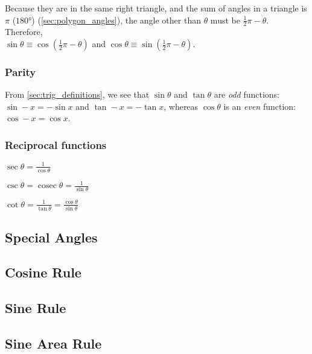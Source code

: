 \documentclass[a4paper,11pt]{article}
\begin{document}
    Because they are in the same right triangle, and the sum of angles in a
    triangle is $\pi$ ($\ang{180}$) (\ref{sec:polygon_angles}), the angle other
    than $\theta$ must be $\frac 12 \pi - \theta$. Therefore,
    \\$\sin \theta \equiv \cos(\frac 12 \pi - \theta)$ and
    $\cos \theta \equiv \sin(\frac 12 \pi - \theta)$.

    \subsubsection{Parity} \label{sec:trig_parity}

    From \ref{sec:trig_definitions}, we see that $\sin \theta$ and $\tan \theta$
    are \textit{odd} functions: $\sin -x = -\sin x$ and $\tan -x = -\tan x$,
    whereas $\cos \theta$ is an \textit{even} function: $\cos -x = \cos x$.

    \subsubsection{Reciprocal functions} \label{sec:trig_reciprocal}

    $\displaystyle\sec \theta = \frac{1}{\cos \theta}$

    $\displaystyle\csc \theta = \operatorname{cosec} \theta
        = \frac{1}{\sin \theta}$

    $\displaystyle\cot \theta = \frac{1}{\tan \theta}
        = \frac{\cos \theta}{\sin \theta}$

    \subsection{Special Angles}


    \subsection{Cosine Rule}

    \subsection{Sine Rule}

    \subsection{Sine Area Rule}
\end{document}
